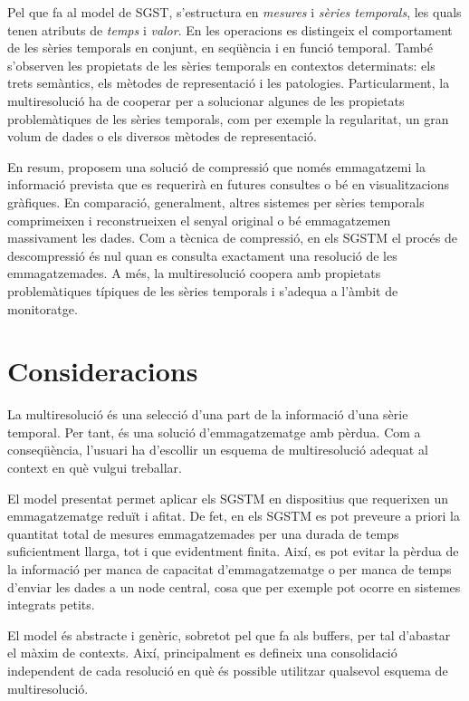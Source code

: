 Pel que fa al model de \gls{SGST}, s'estructura en \emph{mesures} i
\emph{sèries temporals}, les quals tenen atributs de \emph{temps} i
\emph{valor}. En les operacions es distingeix el comportament de les
sèries temporals en conjunt, en seqüència i en funció temporal.  També
s'observen les propietats de les sèries temporals en contextos
determinats: els trets semàntics, els mètodes de representació i les
patologies.  Particularment, la multiresolució ha de cooperar per a
solucionar algunes de les propietats problemàtiques de les sèries
temporals, com per exemple la regularitat, un gran volum de dades o
els diversos mètodes de representació.


En resum, proposem una solució de compressió que només emmagatzemi la
informació prevista que es requerirà en futures consultes o bé en
visualitzacions gràfiques.  En comparació, generalment, altres
sistemes per sèries temporals comprimeixen i reconstrueixen el senyal
original o bé emmagatzemen massivament les dades.  Com a tècnica de
compressió, en els \gls{SGSTM} el procés de descompressió és nul quan
es consulta exactament una resolució de les emmagatzemades.  A més, la
multiresolució coopera amb propietats problemàtiques típiques de les
sèries temporals i s'adequa a l'àmbit de monitoratge.


\section{Consideracions}

La multiresolució és una selecció d'una part de la informació d'una
sèrie temporal. Per tant, és una solució d'emmagatzematge amb
pèrdua. Com a conseqüència, l'usuari ha d'escollir un esquema de
multiresolució adequat al context en què vulgui treballar.



El model presentat permet aplicar els \gls{SGSTM} en dispositius que
requerixen un emmagatzematge reduït i afitat. De fet, en els
\gls{SGSTM} es pot preveure a priori la quantitat total de mesures
emmagatzemades per una durada de temps suficientment llarga, tot i que
evidentment finita. Així, es pot evitar la pèrdua de la informació per
manca de capacitat d'emmagatzematge o per manca de temps d'enviar les
dades a un node central, cosa que per exemple pot ocorre en sistemes
integrats petits.


El model és abstracte i genèric, sobretot pel que fa als buffers, per
tal d'abastar el màxim de contexts. Així, principalment es defineix
una consolidació independent de cada resolució en què és possible
utilitzar qualsevol esquema de multiresolució.



